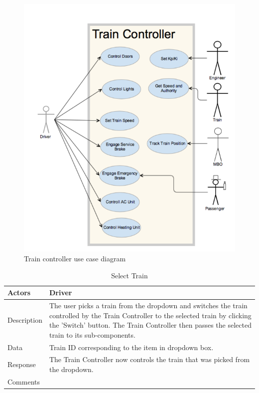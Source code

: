 \documentclass[]{article}
\begin{document}
\begin{figure}[H]
	\centering
	\includegraphics[width=\textwidth]{traincontrollerusecase.png}
	\caption{Train controller use case diagram}
\end{figure}

\begin{table}[H]
	\centering
	\caption{Select Train}
	\begin{tabular}{|l|l|}
		\hline
		Actors & \parbox[t]{10cm}{Driver} \\ \hline
		Description & \parbox[t]{10cm}{The user picks a train from the dropdown and switches the train controlled by the Train Controller to the selected train by clicking the 'Switch' button. The Train Controller then passes the selected train to its sub-components. } \\ \hline
		Data &  \parbox[t]{10cm}{Train ID corresponding to the item in dropdown box.} \\ \hline
		Response & \parbox[t]{10cm}{The Train Controller now controls the train that was picked from the dropdown.  }\\ \hline
		Comments & \parbox[t]{10cm}{}  \\ \hline
	\end{tabular}
\end{table}
\end{document}
